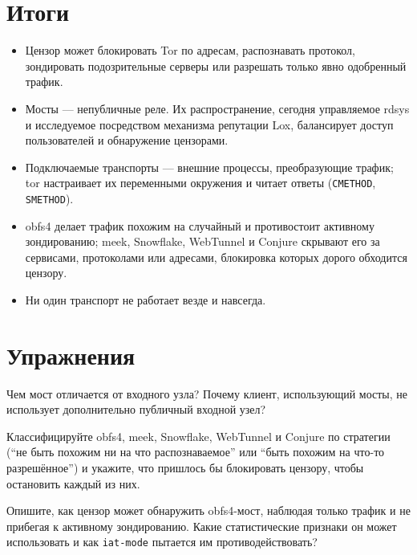 \section*{Итоги}
\begin{itemize}
  \item Цензор может блокировать Tor по адресам, распознавать протокол, зондировать подозрительные серверы или разрешать только явно одобренный трафик.
  \item Мосты --- непубличные реле. Их распространение, сегодня управляемое rdsys и исследуемое посредством механизма репутации Lox, балансирует доступ пользователей и обнаружение цензорами.
  \item Подключаемые транспорты --- внешние процессы, преобразующие трафик; tor настраивает их переменными окружения и читает ответы (\texttt{CMETHOD}, \texttt{SMETHOD}).
  \item obfs4 делает трафик похожим на случайный и противостоит активному зондированию; meek, Snowflake, WebTunnel и Conjure скрывают его за сервисами, протоколами или адресами, блокировка которых дорого обходится цензору.
  \item Ни один транспорт не работает везде и навсегда.
\end{itemize}

\section*{Упражнения}

\begin{esercizio}[1]\label{es:16-guard}
Чем мост отличается от входного узла? Почему клиент, использующий мосты, не использует дополнительно публичный входной узел?
\end{esercizio}

\begin{esercizio}[1]\label{es:16-strategie}
Классифицируйте obfs4, meek, Snowflake, WebTunnel и Conjure по стратегии (\enquote{не быть похожим ни на что распознаваемое} или \enquote{быть похожим на что-то разрешённое}) и укажите, что пришлось бы блокировать цензору, чтобы остановить каждый из них.
\end{esercizio}

\begin{esercizio}[2]\label{es:16-sondaggio}
Опишите, как цензор может обнаружить obfs4-мост, наблюдая только трафик и не прибегая к активному зондированию. Какие статистические признаки он может использовать и как \texttt{iat-mode} пытается им противодействовать?
\end{esercizio}

